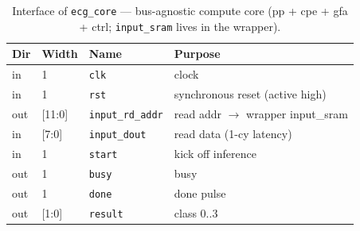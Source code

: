 \begin{table}[t]
\centering
\caption{Interface of \texttt{ecg\_core} — bus-agnostic compute core
(pp + cpe + gfa + ctrl; \texttt{input\_sram} lives in the wrapper).}
\label{tab:if-ecg-core}
\small
\setlength{\tabcolsep}{4pt}
\renewcommand{\arraystretch}{1.1}
\begin{tabular}{@{}llll@{}}
\toprule
\textbf{Dir} & \textbf{Width} & \textbf{Name} & \textbf{Purpose} \\
\midrule
in  & 1      & \texttt{clk}            & clock \\
in  & 1      & \texttt{rst}            & synchronous reset (active high) \\
out & [11:0] & \texttt{input\_rd\_addr}& read addr $\to$ wrapper input\_sram \\
in  & [7:0]  & \texttt{input\_dout}    & read data (1-cy latency) \\
in  & 1      & \texttt{start}          & kick off inference \\
out & 1      & \texttt{busy}           & busy \\
out & 1      & \texttt{done}           & done pulse \\
out & [1:0]  & \texttt{result}         & class 0..3 \\
\bottomrule
\end{tabular}
\end{table}


